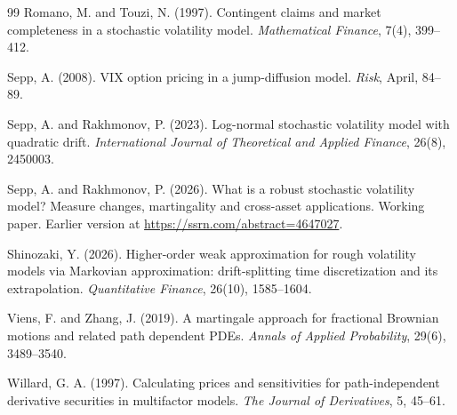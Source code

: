 \documentclass[11pt,a4paper]{article}
\theoremstyle{definition}
\begin{document}
\begin{thebibliography}{99}
Romano, M. and Touzi, N. (1997). Contingent claims and market completeness in a stochastic volatility model. \emph{Mathematical Finance}, 7(4), 399--412.

Sepp, A. (2008). VIX option pricing in a jump-diffusion model. \emph{Risk}, April, 84--89.

Sepp, A. and Rakhmonov, P. (2023). Log-normal stochastic volatility model with quadratic drift. \emph{International Journal of Theoretical and Applied Finance}, 26(8), 2450003.

Sepp, A. and Rakhmonov, P. (2026). What is a robust stochastic volatility model? Measure changes, martingality and cross-asset applications. Working paper. Earlier version at \url{https://ssrn.com/abstract=4647027}.

Shinozaki, Y. (2026). Higher-order weak approximation for rough volatility models via Markovian approximation: drift-splitting time discretization and its extrapolation. \emph{Quantitative Finance}, 26(10), 1585--1604.

Viens, F. and Zhang, J. (2019). A martingale approach for fractional Brownian motions and related path dependent PDEs. \emph{Annals of Applied Probability}, 29(6), 3489--3540.

Willard, G. A. (1997). Calculating prices and sensitivities for path-independent derivative securities in multifactor models. \emph{The Journal of Derivatives}, 5, 45--61.

\end{thebibliography}
\end{document}
